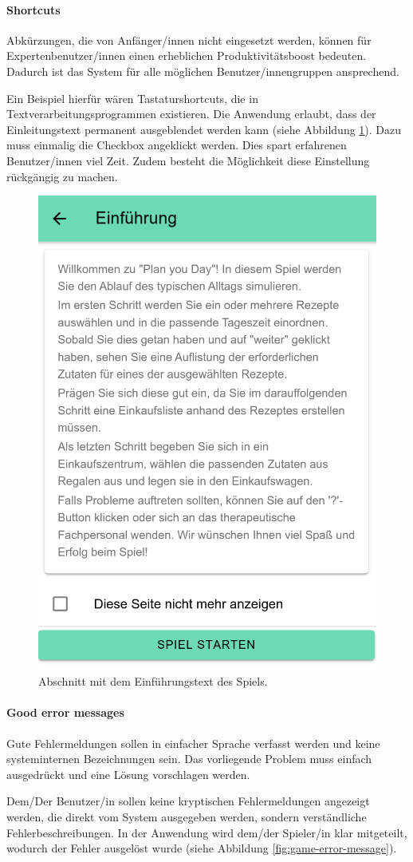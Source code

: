 \paragraph{Shortcuts}
Abkürzungen, die von Anfänger/innen nicht eingesetzt werden, können für Expertenbenutzer/innen einen erheblichen Produktivitätsboost bedeuten. Dadurch ist das System für alle möglichen Benutzer/innengruppen ansprechend. \cite{nielsen:1993:usability}

Ein Beispiel hierfür wären Tastaturshortcuts, die in Textverarbeitungsprogrammen existieren. Die Anwendung erlaubt, dass der Einleitungstext permanent ausgeblendet werden kann (siehe Abbildung \ref{fig:game-introduction-page}). Dazu muss einmalig die Checkbox angeklickt werden. Dies spart erfahrenen Benutzer/innen viel Zeit. Zudem besteht die Möglichkeit diese Einstellung rückgängig zu machen.

\begin{figure}[H]
    \centering
	\includegraphics[width=0.4\linewidth]{figures/development/application/introduction.png}
	\caption{Abschnitt mit dem Einführungstext des Spiels.}
	\label{fig:game-introduction-page}
\end{figure}

\paragraph{Good error messages}
Gute Fehlermeldungen sollen in einfacher Sprache verfasst werden und keine systeminternen Bezeichnungen sein. Das vorliegende Problem muss einfach ausgedrückt und eine Lösung vorschlagen werden. \cite{nielsen:1993:usability}

Dem/Der Benutzer/in sollen keine kryptischen Fehlermeldungen angezeigt werden, die direkt vom System ausgegeben werden, sondern verständliche Fehlerbeschreibungen. In der Anwendung wird dem/der Spieler/in klar mitgeteilt, wodurch der Fehler ausgelöst wurde (siehe Abbildung \ref{fig:game-error-message}).

